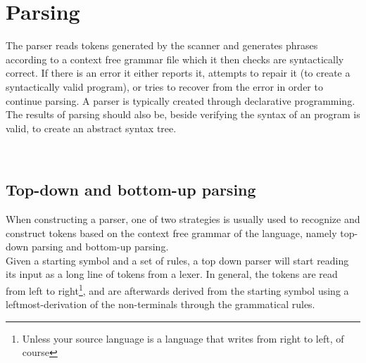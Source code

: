 \section{Parsing}
The parser reads tokens generated by the scanner and generates phrases according to a context free grammar file which it then checks are syntactically correct. If there is an error it either reports it, attempts to repair it (to create a syntactically valid program), or tries to recover from the error in order to continue parsing. A parser is typically created through declarative programming. The results of parsing should also be, beside verifying the syntax of an program is valid, to create an abstract syntax tree.

\\
\subsection*{Top-down and bottom-up parsing}
When constructing a parser, one of two strategies is usually used to recognize and construct tokens based on the context free grammar of the language, namely top-down parsing and bottom-up parsing.\\

Given a starting symbol and a set of rules, a top down parser will start reading its input as a long line of tokens from a lexer. In general, the tokens are read from left to right\footnote{Unless your source language is a language that writes from right to left, of course}, and are afterwards derived from the starting symbol using a leftmost-derivation of the non-terminals through the grammatical rules.


